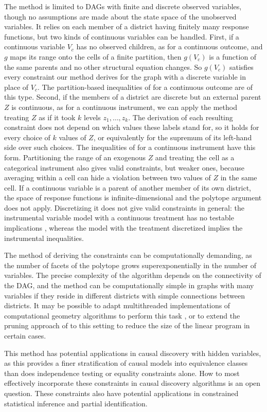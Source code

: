 \documentclass[12pt]{article}
\begin{document}
The method is limited to DAGs with finite and discrete observed variables, though no assumptions are made about the state space of the unobserved variables. It relies on each member of a district having finitely many response functions, but two kinds of continuous variables can be handled. First, if a continuous variable $V_c$ has no observed children, as for a continuous outcome, and $g$ maps its range onto the cells of a finite partition, then $g(V_c)$ is a function of the same parents and no other structural equation changes. So $g(V_c)$ satisfies every constraint our method derives for the graph with a discrete variable in place of $V_c$. The partition-based inequalities of \citet{kedagni2020generalized} for a continuous outcome are of this type. Second, if the members of a district are discrete but an external parent $Z$ is continuous, as for a continuous instrument, we can apply the method treating $Z$ as if it took $k$ levels $z_1, \ldots, z_k$. The derivation of each resulting constraint does not depend on which values these labels stand for, so it holds for every choice of $k$ values of $Z$, or equivalently for the supremum of its left-hand side over such choices. The inequalities of \citet{kedagni2020generalized} for a continuous instrument have this form. Partitioning the range of an exogenous $Z$ and treating the cell as a categorical instrument also gives valid constraints, but weaker ones, because averaging within a cell can hide a violation between two values of $Z$ in the same cell. If a continuous variable is a parent of another member of its own district, the space of response functions is infinite-dimensional and the polytope argument does not apply. Discretizing it does not give valid constraints in general: the instrumental variable model with a continuous treatment has no testable implications \citep{gunsilius2021nontestability}, whereas the model with the treatment discretized implies the instrumental inequalities.




The method of deriving the constraints can be computationally demanding, as the number of facets of the polytope grows superexponentially in the number of variables. The precise complexity of the algorithm depends on the connectivity of the DAG, and the method can be computationally simple in graphs with many variables if they reside in different districts with simple connections between districts. It may be possible to adapt multithreaded implementations of computational geometry algorithms to perform this task \citep{Normaliz}, or to extend the pruning approach of \citet{shridharan2023scalable} to this setting to reduce the size of the linear program in certain cases.

This method has potential applications in causal discovery with hidden variables, as this provides a finer stratification of causal models into equivalence classes than does independence testing or equality constraints alone. How to most effectively incorporate these constraints in causal discovery algorithms is an open question. These constraints also have potential applications in constrained statistical inference and partial identification.






\end{document}
